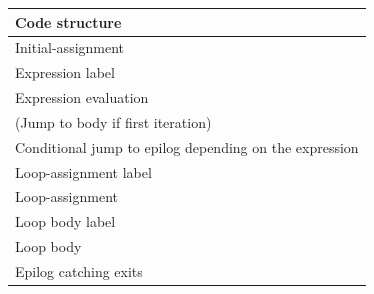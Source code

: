 \documentclass[a4paper]{scrartcl}
\begin{document}
      \begin{table}[hbt]
        \centering
        \begin{tabular}{l}
          \toprule
          \textbf{Code structure}\\
          \midrule
          Initial-assignment\\
          Expression label\\
          Expression evaluation\\
          (Jump to body if first iteration)\\
          Conditional jump to epilog depending on the expression\\
          Loop-assignment label\\
          \hspace{0.5cm} Loop-assignment\\
          Loop body label\\
          \hspace{0.5cm} Loop body\\
          Epilog catching exits\\
          \bottomrule
        \end{tabular}
      \end{table}
    
\end{document}
